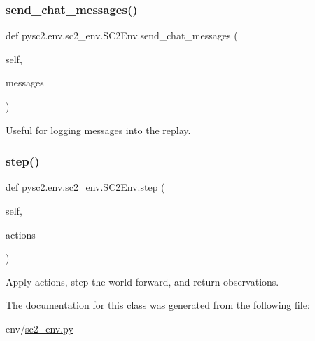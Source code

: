 \mbox{\label{classpysc2_1_1env_1_1sc2__env_1_1_s_c2_env_aa4cf7a2cf39426085b9d14ef2ecac855}} 
\subsubsection{\texorpdfstring{send\+\_\+chat\+\_\+messages()}{send\_chat\_messages()}}
{\footnotesize\ttfamily def pysc2.\+env.\+sc2\+\_\+env.\+S\+C2\+Env.\+send\+\_\+chat\+\_\+messages (\begin{DoxyParamCaption}\item[{}]{self,  }\item[{}]{messages }\end{DoxyParamCaption})}

\begin{DoxyVerb}Useful for logging messages into the replay.\end{DoxyVerb}
 \mbox{\label{classpysc2_1_1env_1_1sc2__env_1_1_s_c2_env_afde565357f8e64e50a8e03df0c1a1d4c}} 
\subsubsection{\texorpdfstring{step()}{step()}}
{\footnotesize\ttfamily def pysc2.\+env.\+sc2\+\_\+env.\+S\+C2\+Env.\+step (\begin{DoxyParamCaption}\item[{}]{self,  }\item[{}]{actions }\end{DoxyParamCaption})}

\begin{DoxyVerb}Apply actions, step the world forward, and return observations.\end{DoxyVerb}
 

The documentation for this class was generated from the following file\+:\begin{DoxyCompactItemize}
\item 
env/\mbox{\hyperlink{sc2__env_8py}{sc2\+\_\+env.\+py}}\end{DoxyCompactItemize}
